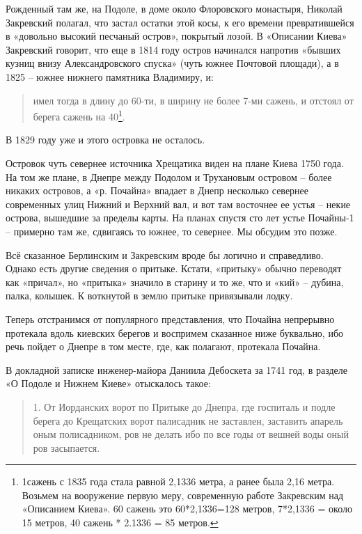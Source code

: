 Рожденный там же, на Подоле, в доме около Флоровского монастыря, Николай Закревский полагал, что застал остатки этой косы, к его времени превратившейся в «довольно высокий песчаный остров», покрытый лозой. В «Описании Киева»\cite{zakr01} Закревский говорит, что еще в 1814 году остров начинался напротив «бывших кузниц внизу Александровского спуска» (чуть южнее Почтовой площади), а в 1825 – южнее нижнего памятника Владимиру, и:

\begin{quotation}
имел тогда в длину до 60-ти, в ширину не более 7-ми сажень, и отстоял от берега сажень на 40\footnote{1сажень с 1835 года стала равной 2,1336 метра, а ранее была 2,16 метра. Возьмем на вооружение первую меру, современную работе Закревским над «Описанием Киева». 60 сажень это 60*2,1336=128 метров, 7*2,1336 = около 15 метров, 40 сажень * 2.1336 = 85 метров.}.
\end{quotation}

В 1829 году уже и этого островка не осталось.

Островок чуть севернее источника Хрещатика виден на плане Киева 1750 года. На том же плане, в Днепре между Подолом и Трухановым островом – более никаких островов, а «р. Почайна» впадает в Днепр несколько севернее современных улиц Нижний и Верхний вал, и вот там восточнее ее устья – некие острова, вышедшие за пределы карты. На планах спустя сто лет устье Почайны-1 – примерно там же, сдвигаясь то южнее, то севернее. Мы обсудим это позже.

Всё сказанное Берлинским и Закревским вроде бы логично и справедливо. Однако есть другие сведения о притыке. Кстати, «притыку» обычно переводят как «причал», но «притыка» значило в старину и то же, что и «кий» – дубина, палка, колышек. К воткнутой в землю притыке привязывали лодку.

Теперь отстранимся от популярного представления, что Почайна непрерывно протекала вдоль киевских берегов и воспримем сказанное ниже буквально, ибо речь пойдет о Днепре в том месте, где, как полагают, протекала Почайна.

В докладной записке инженер-майора Даниила Дебоскета за 1741 год, в разделе «О Подоле и Нижнем Киеве» отыскалось такое:

\begin{quotation}
1. От Иорданских ворот по Притыке до Днепра, где госпиталь и подле берега до Крещатских ворот палисадник не заставлен, заставить апарель оным полисадником, ров не делать ибо по все годы от вешней воды оный ров засыпается.
\end{quotation}

